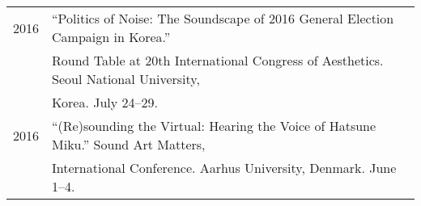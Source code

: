 \documentclass[a4paper,11pt,draft]{article}
\begin{document}
\begin{tabular}{p{2.5cm} p{12.5cm}}
    2016 & “Politics of Noise: The Soundscape of 2016 General Election Campaign
    in Korea.”\\
    & Round Table at 20th International Congress of Aesthetics. Seoul National
    University,\\
    & Korea. July 24--29.\\[2mm]
  
    2016 & “(Re)sounding the Virtual: Hearing the Voice of Hatsune Miku.” Sound
    Art Matters,\\
    & International Conference. Aarhus University, Denmark. June 1--4.\\[2mm]
  
  
    
    
    
    
  \end{tabular}
  
\end{document}
